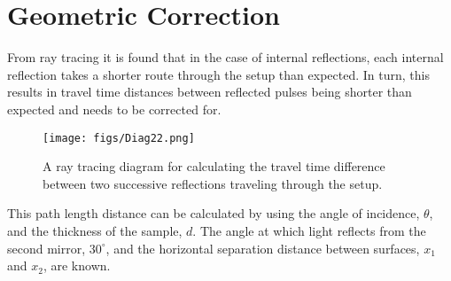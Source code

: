 




\section{Geometric Correction}
\label{sec:GeoCor}

From ray tracing it is found that in the case of internal reflections, each internal reflection takes a shorter route through the setup than expected. In turn, this results in travel time distances between reflected pulses being shorter than expected and needs to be corrected for.

\begin{figure}[H]
\begin{center}
\texttt{[image: figs/Diag22.png]}
\end{center}
\caption[Diagram depicting ray-trace of internal reflection compared to surface reflection]{A ray tracing diagram for calculating the travel time difference between two successive reflections traveling through the setup.}
\end{figure}

This path length distance can be calculated by using the angle of incidence, $\theta$, and the thickness of the sample, $d$. The angle at which light reflects from the second mirror, $30^{\circ}$, and the horizontal separation distance between surfaces, $x_{1}$ and $x_{2}$, are known.


